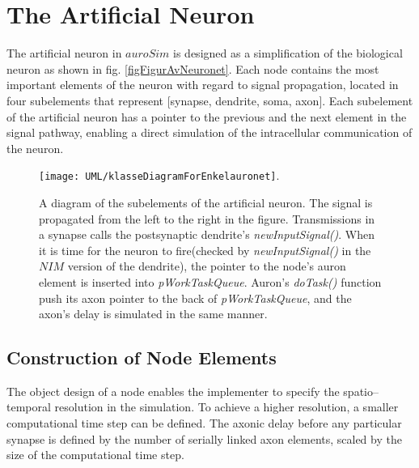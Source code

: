  		\section{The Artificial Neuron} 
			The artificial neuron in $auroSim$ is designed as a simplification of the biological neuron as shown in fig. \ref{figFigurAvNeuronet}.
			Each node contains the most important elements of the neuron with regard to signal propagation, %
				located in four subelements that represent [synapse, dendrite, soma, axon].
			Each subelement of the artificial neuron has a pointer to the previous and the next element in the signal pathway, enabling a direct simulation of the intracellular communication of the neuron.
			
\begin{figure}[hbt!p]
	\centering
	\texttt{[image: UML/klasseDiagramForEnkelauronet]}.
	\caption[A sketch of the subelement design of a node in the ANN, enabling the intracellular communication scheme used for signal propagation in the artificial neuron]
				{A diagram of the subelements of the artificial neuron.
				The signal is propagated from the left to the right in the figure.
				Transmissions in a synapse calls the postsynaptic dendrite's \emph{newInputSignal()}.
				When it is time for the neuron to fire(checked by \emph{newInputSignal()} in the $NIM$ version of the dendrite), the pointer to the node's auron element is inserted into \emph{pWorkTaskQueue}.
				Auron's \emph{doTask()} function push its axon pointer to the back of \emph{pWorkTaskQueue}, and the axon's delay is simulated in the same manner.
				}
	\label{figUMLClassDiagramForASingleNeuron}
\end{figure}






		\subsection*{Construction of Node Elements}

			The object design of a node enables the implementer to specify the spatio--temporal resolution in the simulation.
			To achieve a higher resolution, a smaller computational time step can be defined.
			The axonic delay before any particular synapse is defined by the number of serially linked axon elements, scaled by the size of the computational time step.


